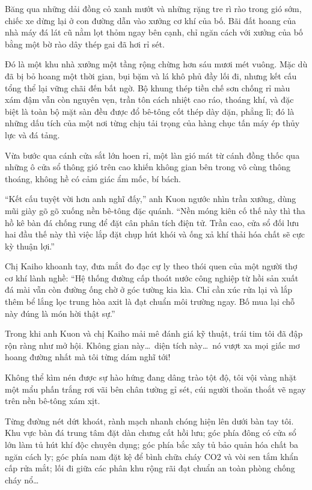\documentclass[../main.tex]{subfiles}
\begin{document}
Băng qua những dải đồng cỏ xanh mướt và những rặng tre rì rào trong gió sớm, chiếc xe dừng lại ở con đường dẫn vào xưởng cơ khí của bố. Bãi đất hoang của nhà máy đá lát cũ nằm lọt thỏm ngay bên cạnh, chỉ ngăn cách với xưởng của bố bằng một bờ rào dây thép gai đã hơi rỉ sét.

Đó là một khu nhà xưởng một tầng rộng chừng hơn sáu mươi mét vuông. Mặc dù đã bị bỏ hoang một thời gian, bụi bặm và lá khô phủ đầy lối đi, nhưng kết cấu tổng thể lại vững chãi đến bất ngờ. Bộ khung thép tiền chế sơn chống rỉ màu xám đậm vẫn còn nguyên vẹn, trần tôn cách nhiệt cao ráo, thoáng khí, và đặc biệt là toàn bộ mặt sàn đều được đổ bê-tông cốt thép dày dặn, phẳng lì; đó là những dấu tích của một nơi từng chịu tải trọng của hàng chục tấn máy ép thủy lực và đá tảng.

Vừa bước qua cánh cửa sắt lớn hoen rỉ, một làn gió mát từ cánh đồng thốc qua những ô cửa sổ thông gió trên cao khiến không gian bên trong vô cùng thông thoáng, không hề có cảm giác ẩm mốc, bí bách.

``Kết cấu tuyệt vời hơn anh nghĩ đấy,'' anh Kuon ngước nhìn trần xưởng, dùng mũi giày gõ gõ xuống nền bê-tông đặc quánh. ``Nền móng kiên cố thế này thì tha hồ kê bàn đá chống rung để đặt cân phân tích điện tử. Trần cao, cửa sổ đối lưu hai đầu thế này thì việc lắp đặt chụp hút khói và ống xả khí thải hóa chất sẽ cực kỳ thuận lợi.''

Chị Kaiho khoanh tay, đưa mắt đo đạc cự ly theo thói quen của một người thợ cơ khí lành nghề: ``Hệ thống đường cấp thoát nước công nghiệp từ hồi sản xuất đá mài vẫn còn đường ống chờ ở góc tường kia kìa. Chỉ cần xúc rửa lại và lắp thêm bể lắng lọc trung hòa axit là đạt chuẩn môi trường ngay. Bố mua lại chỗ này đúng là món hời thật sự.''

Trong khi anh Kuon và chị Kaiho mải mê đánh giá kỹ thuật, trái tim tôi đã đập rộn ràng như mở hội. Không gian này\dots\ diện tích này\dots\ nó vượt xa mọi giấc mơ hoang đường nhất mà tôi từng dám nghĩ tới!

Không thể kìm nén được sự hào hứng đang dâng trào tột độ, tôi vội vàng nhặt một mẩu phấn trắng rơi vãi bên chân tường gỉ sét, cúi người thoăn thoắt vẽ ngay trên nền bê-tông xám xịt.

Từng đường nét dứt khoát, rành mạch nhanh chóng hiện lên dưới bàn tay tôi. Khu vực bàn đá trung tâm đặt dàn chưng cất hồi lưu; góc phía đông có cửa sổ lớn làm tủ hút khí độc chuyên dụng; góc phía bắc xây tủ bảo quản hóa chất ba ngăn cách ly; góc phía nam đặt kệ để bình chữa cháy CO2 và vòi sen tắm khẩn cấp rửa mắt; lối đi giữa các phân khu rộng rãi đạt chuẩn an toàn phòng chống cháy nổ\dots
\end{document}
